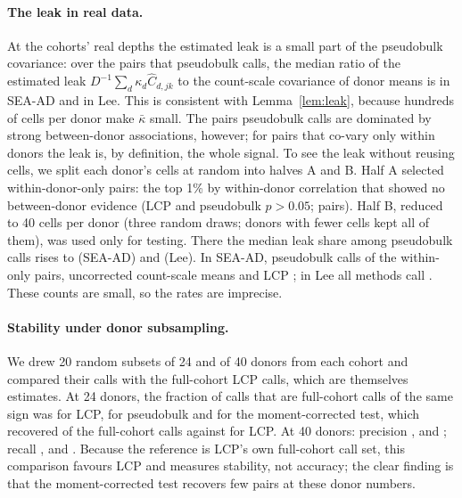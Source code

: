\paragraph{The leak in real data.} At the cohorts' real depths the estimated leak is a small part of the pseudobulk covariance: over the pairs that pseudobulk calls, the median ratio of the estimated leak $D^{-1}\sum_d\kappa_d\hat C_{d,jk}$ to the count-scale covariance of donor means is \SEAADleakFull{} in SEA-AD and \LEEleakFull{} in Lee. This is consistent with Lemma~\ref{lem:leak}, because hundreds of cells per donor make $\bar\kappa$ small. The pairs pseudobulk calls are dominated by strong between-donor associations, however; for pairs that co-vary only within donors the leak is, by definition, the whole signal. To see the leak without reusing cells, we split each donor's cells at random into halves A and B. Half A selected within-donor-only pairs: the top 1\% by within-donor correlation that showed no between-donor evidence (LCP and pseudobulk $p>0.05$; \capNwithin{} pairs). Half B, reduced to 40 cells per donor (three random draws; donors with fewer cells kept all of them), was used only for testing. There the median leak share among pseudobulk calls rises to \SEAADleakSplit{} (SEA-AD) and \LEEleakSplit{} (Lee). In SEA-AD, pseudobulk calls \capPBSEAAD{} of the within-only pairs, uncorrected count-scale means \capnaiveSEAAD{} and LCP \capLCPSEAAD{}; in Lee all methods call \capLCPLEE{}. These counts are small, so the rates are imprecise.

\paragraph{Stability under donor subsampling.} We drew 20 random subsets of 24 and of 40 donors from each cohort and compared their calls with the full-cohort LCP calls, which are themselves estimates. At 24 donors, the fraction of calls that are full-cohort calls of the same sign was \precLCPDtwentyfour{} for LCP, \precPBDtwentyfour{} for pseudobulk and \precMCDtwentyfour{} for the moment-corrected test, which recovered \recMCDtwentyfour{} of the full-cohort calls against \recLCPDtwentyfour{} for LCP. At 40 donors: precision \precLCPDforty{}, \precPBDforty{} and \precMCDforty{}; recall \recLCPDforty{}, \recPBDforty{} and \recMCDforty{}. Because the reference is LCP's own full-cohort call set, this comparison favours LCP and measures stability, not accuracy; the clear finding is that the moment-corrected test recovers few pairs at these donor numbers.

